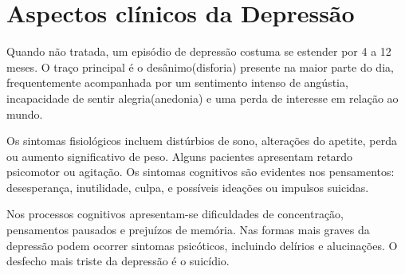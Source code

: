 \section{Aspectos clínicos da Depressão}

 Quando não tratada, um episódio de depressão costuma se estender por 4 a 12 meses. O traço principal é o desânimo(disforia) presente na maior parte do dia, frequentemente acompanhada por um sentimento intenso de angústia, incapacidade de sentir alegria(anedonia) e uma perda de interesse em relação ao mundo. \cite{Kandel}

Os sintomas fisiológicos incluem distúrbios de sono, alterações do apetite, perda ou aumento significativo de peso. Alguns pacientes apresentam retardo psicomotor ou agitação. Os sintomas cognitivos são evidentes nos pensamentos: desesperança, inutilidade, culpa, e possíveis ideações ou impulsos suicidas.  \cite{Kandel}

Nos processos cognitivos apresentam-se dificuldades de concentração, pensamentos pausados e prejuízos de memória. Nas formas mais graves da depressão podem ocorrer sintomas psicóticos, incluindo delírios e alucinações. O desfecho mais triste da depressão é o suicídio. \cite{Kandel}